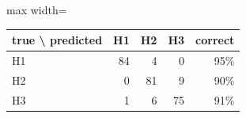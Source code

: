 \begin{adjustbox}{max width=\textwidth}
{\footnotesize
\begin{tabular}{lrrrr}
\toprule
\textbf{true \textbackslash{} predicted} & \textbf{H1} & \textbf{H2} & \textbf{H3} & \textbf{correct} \\
\midrule
H1 & 84 & 4 & 0 & 95\% \\
H2 & 0 & 81 & 9 & 90\% \\
H3 & 1 & 6 & 75 & 91\% \\
\bottomrule
\end{tabular}
}
\end{adjustbox}
